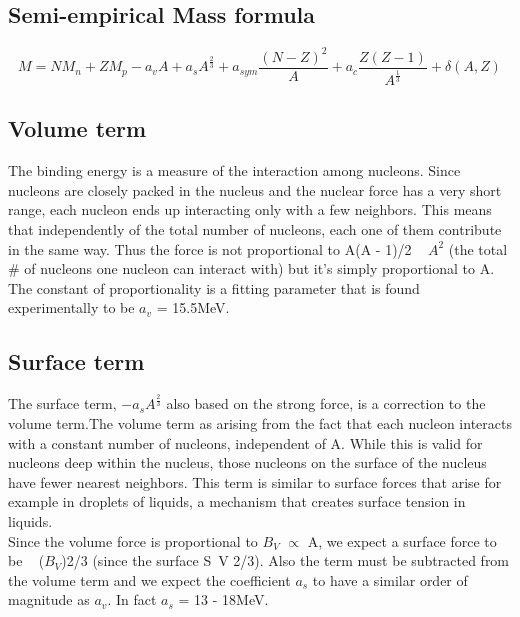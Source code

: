 \documentclass[11pt, a4paper]{article}
\begin{document}
\subsection*{Semi-empirical Mass formula}
\begin{equation}
    \boxed{M = N M_n + Z M_p - a_v A + a_s A^{\frac{2}{3}}+a_{sym}\frac{(N-Z)^2}{A} +a_c \frac{Z(Z-1)}{A^{\frac{1}{3}}}+\delta(A,Z)}
\end{equation}
\subsection*{Volume term}
The binding energy is a measure of the interaction among nucleons. Since nucleons are closely packed in the nucleus and the nuclear force has a very short range, each nucleon ends up interacting only with a few neighbors. This means that independently of the total number of nucleons, each one of them contribute in the same way. Thus the force is not proportional to A(A - 1)/2 ~ $A^2$ (the total \# of nucleons one nucleon can interact with) but it's simply proportional to A. The constant of proportionality is a fitting parameter that is found experimentally to be $a_v$ = 15.5MeV.
\subsection*{Surface term}
The surface term, $-a_s A^{\frac{2}{3}}$ also based on the strong force, is a correction to the volume term.The volume term as arising from the fact that each nucleon interacts with a constant number of nucleons, independent of A. While this is valid for nucleons deep within the nucleus, those nucleons on the surface of the nucleus have fewer nearest neighbors. This term is similar to surface forces that arise for example in droplets of liquids, a mechanism that creates surface tension in liquids.\\
Since the volume force is proportional to $B_V$ $\propto$ A, we expect a surface force to be ~ ($B_V$)2/3 (since the surface S~V 2/3). Also the term must be subtracted from the volume term and we expect the coefficient $a_s$ to have a similar order of magnitude as $a_v$. In fact $a_s$ = 13 - 18MeV.
\end{document}
